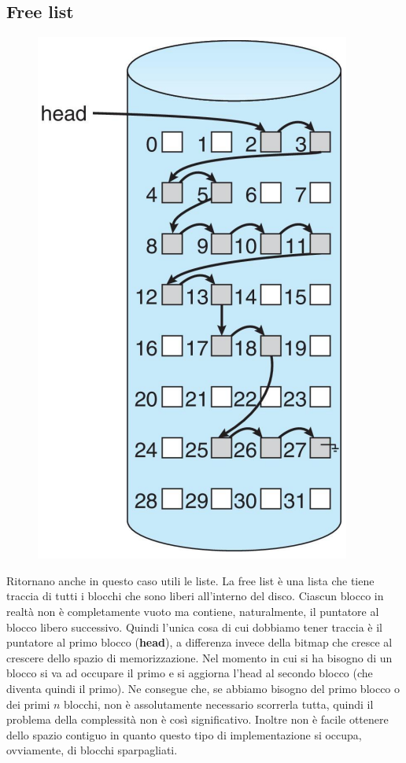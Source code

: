 % 
\subsection{Free list}
\begin{figure}
    \centering
    \includegraphics[width = .25\textwidth]{../res/imgs/file system implementation/free-space list.png}
\end{figure}
Ritornano anche in questo caso utili le liste. La free list è una lista che tiene traccia di tutti i blocchi che sono liberi all'interno del disco. Ciascun blocco in realtà non è completamente vuoto ma contiene, naturalmente, il puntatore al blocco libero successivo. Quindi l'unica cosa di cui dobbiamo tener traccia è il puntatore al primo blocco (\textbf{head}), a differenza invece della bitmap che cresce al crescere dello spazio di memorizzazione. Nel momento in cui si ha bisogno di un blocco si va ad occupare il primo e si aggiorna l'head al secondo blocco (che diventa quindi il primo). Ne consegue che, se abbiamo bisogno del primo blocco o dei primi $n$ blocchi, non è assolutamente necessario scorrerla tutta, quindi il problema della complessità non è così significativo. Inoltre non è facile ottenere dello spazio contiguo in quanto questo tipo di implementazione si occupa, ovviamente, di blocchi sparpagliati. 

% 
